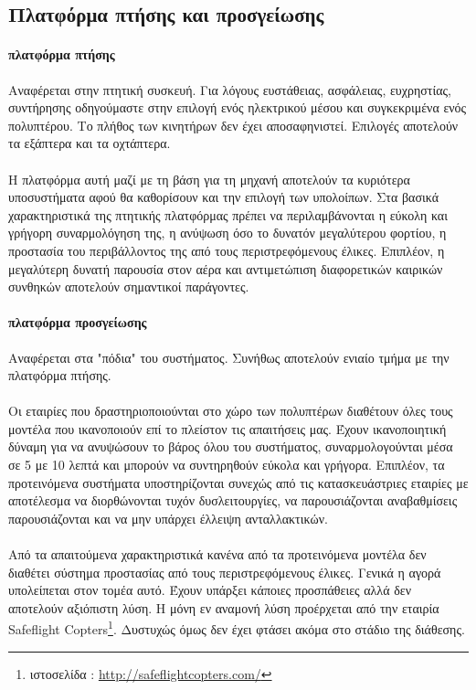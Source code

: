 \documentclass[a4paper, 12pt, twoside]{report}
\begin{document}
{{{{{{		\subsection{Πλατφόρμα πτήσης και προσγείωσης}
			\paragraph{πλατφόρμα πτήσης}{Αναφέρεται στην πτητική συσκευή. Για λόγους ευστάθειας, ασφάλειας, ευχρηστίας, συντήρησης οδηγούμαστε στην επιλογή ενός ηλεκτρικού μέσου και συγκεκριμένα ενός πολυπτέρου. Το πλήθος των κινητήρων δεν έχει αποσαφηνιστεί. Επιλογές αποτελούν τα εξάπτερα και τα οχτάπτερα.
			}
			\paragraph{}{Η πλατφόρμα αυτή μαζί με τη βάση για τη μηχανή αποτελούν τα κυριότερα υποσυστήματα αφού θα καθορίσουν και την επιλογή των υπολοίπων. Στα βασικά χαρακτηριστικά της πτητικής πλατφόρμας πρέπει να περιλαμβάνονται η εύκολη και γρήγορη συναρμολόγηση της, η ανύψωση όσο το δυνατόν μεγαλύτερου φορτίου, η προστασία του περιβάλλοντος της από τους περιστρεφόμενους έλικες. Επιπλέον, η μεγαλύτερη δυνατή παρουσία στον αέρα και αντιμετώπιση διαφορετικών καιρικών συνθηκών αποτελούν σημαντικοί παράγοντες.
			}			
			\paragraph{πλατφόρμα προσγείωσης}{Αναφέρεται στα "πόδια" του συστήματος. Συνήθως αποτελούν ενιαίο τμήμα με την πλατφόρμα πτήσης.
			}
			\paragraph{}{Οι εταιρίες που δραστηριοποιούνται στο χώρο των πολυπτέρων διαθέτουν όλες τους μοντέλα που ικανοποιούν επί το πλείστον τις απαιτήσεις μας. Έχουν ικανοποιητική δύναμη για να ανυψώσουν το βάρος όλου του συστήματος, συναρμολογούνται μέσα σε 5 με 10 λεπτά και μπορούν να συντηρηθούν εύκολα και γρήγορα. Επιπλέον, τα προτεινόμενα συστήματα υποστηρίζονται συνεχώς από τις κατασκευάστριες εταιρίες με αποτέλεσμα να διορθώνονται τυχόν δυσλειτουργίες, να παρουσιάζονται αναβαθμίσεις παρουσιάζονται και να μην υπάρχει έλλειψη ανταλλακτικών.
			}
			\paragraph{}{Από τα απαιτούμενα χαρακτηριστικά κανένα από τα προτεινόμενα μοντέλα δεν διαθέτει σύστημα προστασίας από τους περιστρεφόμενους έλικες. Γενικά η αγορά υπολείπεται στον τομέα αυτό. Έχουν υπάρξει κάποιες προσπάθειες αλλά δεν αποτελούν αξιόπιστη λύση. Η μόνη εν αναμονή λύση προέρχεται από την εταιρία Safeflight Copters\footnote{ιστοσελίδα : \url{http://safeflightcopters.com/}}. Δυστυχώς όμως δεν έχει φτάσει ακόμα στο στάδιο της διάθεσης.
			}
}}}}}}
\end{document}
